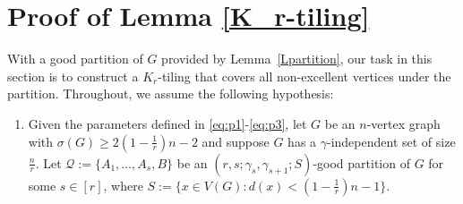 \documentclass[11pt, a4paper]{article}
\theoremstyle{definition}
\newcommand{\<}{\subseteq}
\begin{document}
    




\section{Proof of Lemma \ref{K_r-tiling}}\label{section7}


With a good partition of $G$ provided by Lemma~\ref{Lpartition}, our task in this section is to
construct a $K_r$-tiling that covers all non-excellent vertices under the partition. Throughout, we assume the following hypothesis:

\begin{enumerate}
[label =$(\dag)$]
    \item\label{assumption} Given the parameters defined in \eqref{eq:p1}-\eqref{eq:p3}, let $G$ be an $n$-vertex graph with
$\sigma(G)\ge 2\left(1-\frac{1}{r}\right)n-2$ 
and suppose $G$ has a $\gamma$-independent set of size $\frac{n}{r}$. Let $\mathcal{Q}:=\{A_1,\ldots,A_s,B\}$ be an $(r,s;\gamma_s,\gamma_{s+1};S)$-good partition of $G$ for some $s\in[r]$, where $S:=\{x\in V(G):d(x)<(1-\frac{1}{r})n-1\}.$
\end{enumerate}
\end{document}
